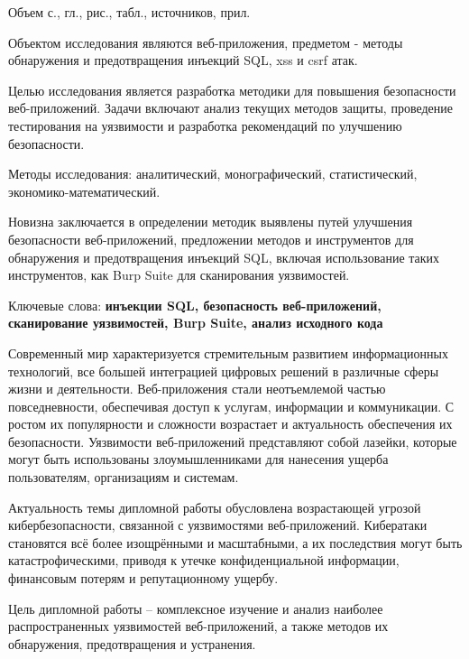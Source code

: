 \documentclass[a4paper,12pt]{diplom}
\begin{document}
	Объем  с.,  гл.,  рис.,
	 табл.,  источников,  прил.
	
	\medskip
	
	Объектом исследования являются веб-приложения, предметом - методы обнаружения и предотвращения инъекций SQL, xss и csrf атак.
	
	Целью исследования является разработка методики для повышения безопасности веб-приложений. Задачи включают анализ текущих методов защиты, проведение тестирования на уязвимости и разработка рекомендаций по улучшению безопасности.
	
	Методы исследования: аналитический, монографический, статистический, экономико-математический.
	
	Новизна заключается в определении методик выявлены путей улучшения безопасности веб-приложений, предложении методов и инструментов для обнаружения и предотвращения инъекций SQL, включая использование таких инструментов, как Burp Suite для сканирования уязвимостей.
	
	\medskip
	
	Ключевые слова: \textbf{инъекции SQL, безопасность веб-приложений, сканирование уязвимостей, Burp Suite, анализ исходного кода}
	
	\medskip
	
	
	\tableofcontents[Содержание]
	
	
	
	
	Современный мир характеризуется стремительным развитием информационных технологий, все большей интеграцией цифровых решений в различные сферы жизни и деятельности. Веб-приложения стали неотъемлемой частью повседневности, обеспечивая доступ к услугам, информации и коммуникации. С ростом их популярности и сложности возрастает и актуальность обеспечения их безопасности. Уязвимости веб-приложений представляют собой лазейки, которые могут быть использованы злоумышленниками для нанесения ущерба пользователям, организациям и системам.
	
	Актуальность темы дипломной работы обусловлена возрастающей угрозой кибербезопасности, связанной с уязвимостями веб-приложений. Кибератаки становятся всё более изощрёнными и масштабными, а их последствия могут быть катастрофическими, приводя к утечке конфиденциальной информации, финансовым потерям и репутационному ущербу. 
	
	Цель дипломной работы – комплексное изучение и анализ наиболее распространенных уязвимостей веб-приложений, а также методов их обнаружения, предотвращения и устранения.
	
\end{document}
